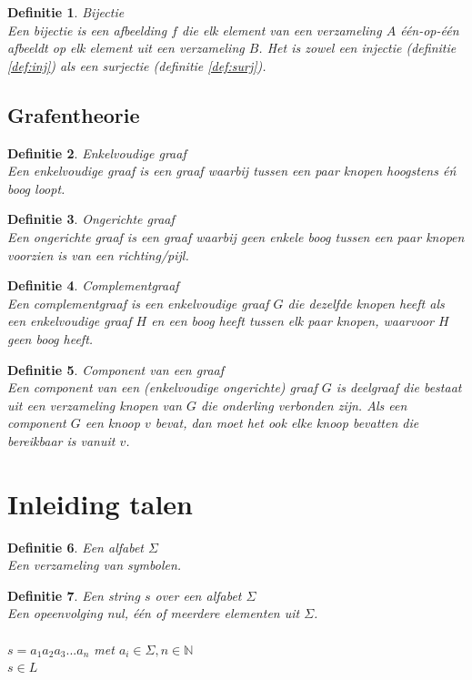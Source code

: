 \documentclass[a4paper]{article}
\newtheorem{tdefinitie}{Definitie}[section]
\newenvironment{definitie}[1]%
  {\begin{mdframed}[backgroundcolor=silver,
    topline=false,
    rightline=false,
    leftline=false,
    bottomline=false]\begin{tdefinitie}#1\\\normalfont}%
  {\end{tdefinitie}\end{mdframed}}
\newcommand{\nat}{\ensuremath{\mathbb{N}}}
\begin{document}
\begin{definitie}{Bijectie}
  Een bijectie is een afbeelding $f$ die elk element van een verzameling $A$ \'e\'en-op-\'e\'en afbeeldt op elk element uit een verzameling $B$. Het is zowel een injectie (definitie \ref{def:inj}) als een surjectie (definitie \ref{def:surj}).
\end{definitie}

\subsection{Grafentheorie}

\begin{definitie}{Enkelvoudige graaf}
  Een enkelvoudige graaf is een graaf waarbij tussen een paar knopen hoogstens \'e\'n boog loopt.
\end{definitie}

\begin{definitie}{Ongerichte graaf}
  Een ongerichte graaf is een graaf waarbij geen enkele boog tussen een paar knopen voorzien is van een richting/pijl.
\end{definitie}

\begin{definitie}{Complementgraaf}
  \label{def:graphcomplement}
  Een complementgraaf is een enkelvoudige graaf $G$ die dezelfde knopen heeft als een enkelvoudige graaf $H$ en een boog heeft tussen elk paar knopen, waarvoor $H$ geen boog heeft.
\end{definitie}

\begin{definitie}{Component van een graaf}
  \label{def:graphcomponent}
  Een component van een (enkelvoudige ongerichte) graaf $G$ is deelgraaf die bestaat uit een verzameling knopen van $G$ die onderling verbonden zijn. Als een component $G$ een knoop $v$ bevat, dan moet het ook elke knoop bevatten die bereikbaar is vanuit $v$.
\end{definitie} 
  
\newpage\section{Inleiding talen}

\begin{definitie}{Een alfabet $\Sigma$}
  Een verzameling van symbolen.
\end{definitie}

\begin{definitie}{Een string $s$ over een alfabet $\Sigma$}
  Een opeenvolging nul, \'e\'en of meerdere elementen uit $\Sigma$. \\
  \\ $s = a_1a_2a_3...a_n$ met $a_i \in \Sigma, n \in \nat$
  \\ $s \in L$
\end{definitie}
\end{document}

